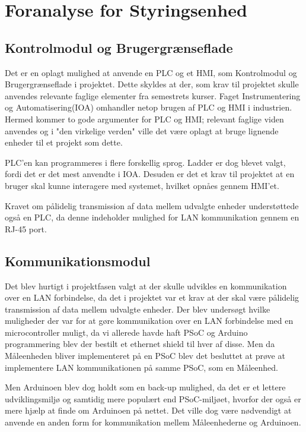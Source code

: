 
\section{Foranalyse for Styringsenhed}

\subsection{Kontrolmodul og Brugergrænseflade}
Det er en oplagt mulighed at anvende en PLC og et HMI, som Kontrolmodul og Brugergrænseflade i projektet. Dette skyldes at der, som krav til projektet skulle anvendes relevante faglige elementer fra semestrets kurser. Faget Instrumentering og Automatisering(IOA) omhandler netop brugen af PLC og HMI i industrien. Hermed kommer to gode argumenter for PLC og HMI; relevant faglige viden anvendes og i "den virkelige verden" ville det være oplagt at bruge lignende enheder til et projekt som dette.

PLC'en kan programmeres i flere forskellig sprog. Ladder er dog blevet valgt, fordi det er det mest anvendte i IOA. Desuden er det et krav til projektet at en bruger skal kunne interagere med systemet, hvilket opnåes gennem HMI'et.

Kravet om pålidelig transmission af data mellem udvalgte enheder understøttede også en PLC, da denne indeholder mulighed for LAN kommunikation gennem en RJ-45 port.

\subsection{Kommunikationsmodul}
Det blev hurtigt i projektfasen valgt at der skulle udvikles en kommunikation over en LAN forbindelse, da det i projektet var et krav at der skal være pålidelig transmission af data mellem udvalgte enheder. Der blev undersøgt hvilke muligheder der var for at gøre kommunikation over en LAN forbindelse med en microcontroller muligt, da vi allerede havde haft PSoC og Arduino programmering blev der bestilt et ethernet shield til hver af disse. Men da Måleenheden bliver implementeret på en PSoC blev det besluttet at prøve at implementere LAN kommunikationen på samme PSoC, som en Måleenhed. 

Men Arduinoen blev dog holdt som en back-up mulighed, da det er et lettere udviklingsmiljø og samtidig mere populært end PSoC-miljøet, hvorfor der også er mere hjælp at finde om Arduinoen på nettet. Det ville dog være nødvendigt at anvende en anden form for kommunikation mellem Måleenhederne og Arduinoen. 






